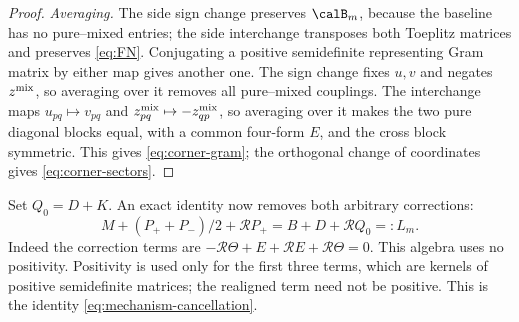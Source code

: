\begin{proof}
\emph{Averaging.} The side sign change preserves $\calB_m$, because the
baseline has no pure--mixed entries; the side interchange transposes
both Toeplitz matrices and preserves \eqref{eq:FN}. Conjugating a positive semidefinite
representing Gram matrix by either map gives another one. The sign
change fixes $u,v$ and negates $z^{\rm mix}$, so averaging over it removes all
pure--mixed couplings. The interchange maps $u_{pq}\mapsto v_{pq}$ and
$z^{\rm mix}_{pq}\mapsto-z^{\rm mix}_{qp}$, so averaging over it makes the two pure
diagonal blocks equal, with a common four-form $E$, and the cross block
symmetric. This gives \eqref{eq:corner-gram}; the orthogonal change of
coordinates gives \eqref{eq:corner-sectors}.
\end{proof}

Set \(Q_0=D+K\). An exact identity now removes both arbitrary corrections:
\begin{equation}
 \boxed{\ M+(P_++P_-)/2+\mathcal RP_+
                       =B+D+\mathcal RQ_0=:L_m.\ }     \label{eq:correction-cancellation}
\end{equation}
Indeed the correction terms are \(-\mathcal R\Theta+E+\mathcal RE+\mathcal R\Theta=0\).
This algebra uses no positivity. Positivity is used only for the first
three terms, which are kernels of positive semidefinite matrices; the
realigned term need not be positive. This is the identity
\eqref{eq:mechanism-cancellation}.
